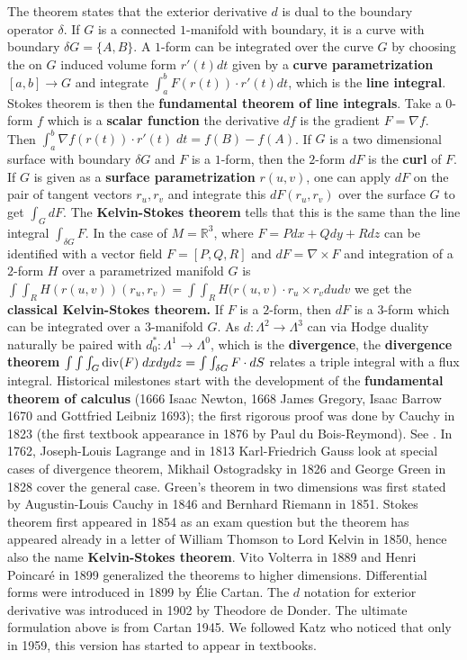 \documentclass[12pt]{amsart}
\begin{document}
The theorem states that the exterior derivative $d$ is dual to the boundary operator $\delta$.
If $G$ is a connected $1$-manifold with boundary, it is a curve
with boundary $\delta G=\{A,B\}$. A $1$-form
can be integrated over the curve $G$ by choosing the on $G$ induced volume form $r'(t) dt$ given by a
{\bf curve parametrization} $[a,b] \to G$ and integrate
$\int_a^b F(r(t)) \cdot r'(t) dt$, which is the {\bf line integral}.
Stokes theorem is then the {\bf fundamental theorem of line integrals}. Take a $0$-form
$f$ which is a {\bf scalar function} the derivative $df$ is the gradient $F=\nabla f$. Then
$\int_a^b \nabla f(r(t)) \cdot r'(t) \; dt=f(B)-f(A)$. If $G$ is a two
dimensional surface with boundary $\delta G$ and $F$ is a $1$-form, then
the $2$-form $dF$ is the {\bf curl} of $F$. If $G$ is given as a
{\bf surface parametrization} $r(u,v)$, one can apply $dF$ on the pair of tangent
vectors $r_u,r_v$ and integrate this $dF(r_u,r_v)$ over the surface $G$ to get $\int_G dF$.
The {\bf Kelvin-Stokes theorem} tells that this is the same than the line integral $\int_{\delta G} F$.
In the case of $M=\mathbb{R}^3$, where $F=Pdx+Qdy+Rdz$ can be identified with a
vector field $F=[P,Q,R]$ and $dF = \nabla \times F$ and integration of a $2$-form $H$
over a parametrized manifold $G$ is
$\int \int_R H(r(u,v))(r_u,r_v) = \int \int_R H(r(u,v) \cdot r_u \times r_v du dv$
we get the {\bf classical Kelvin-Stokes theorem.} If $F$ is a $2$-form, then $dF$ is a
$3$-form which can be integrated over a $3$-manifold $G$. As $d: \Lambda^2 \to \Lambda^3$
can via Hodge duality naturally be paired with $d_0^*: \Lambda^1 \to \Lambda^0$, which is the
{\bf divergence}, the {\bf divergence theorem} $\int \int \int_G {\rm div}(F) \; dx dy dz 
= \int\int_{\delta G} F \cdot dS$ relates a triple integral with a flux integral.
Historical milestones start with the development of the {\bf fundamental theorem of calculus}
(1666 Isaac Newton, 1668 James Gregory, Isaac Barrow 1670 and Gottfried Leibniz 1693);
the first rigorous proof was done by Cauchy in 1823 (the first textbook appearance in 1876 by Paul du Bois-Reymond).
See \cite{BressoudPortland}. In 1762, Joseph-Louis Lagrange and in 1813 Karl-Friedrich Gauss look
at special cases of divergence theorem, Mikhail Ostogradsky in 1826 and George Green in 1828
cover the general case. Green's theorem in two dimensions was first stated
by Augustin-Louis Cauchy in 1846 and Bernhard Riemann in 1851. Stokes theorem first appeared
in 1854 as an exam question but the theorem has appeared already in a letter of William Thomson
to Lord Kelvin in 1850, hence also the name {\bf Kelvin-Stokes theorem}.
Vito Volterra in 1889 and Henri Poincar\'e in 1899 generalized the theorems to higher dimensions.
Differential forms were introduced in 1899 by \'Elie Cartan. The $d$ notation for exterior
derivative was introduced in 1902 by Theodore de Donder. The ultimate formulation above is
from Cartan 1945. We followed Katz \cite{HistoryStokes} who noticed that only in 1959,
this version has started to appear in textbooks.
\end{document}
